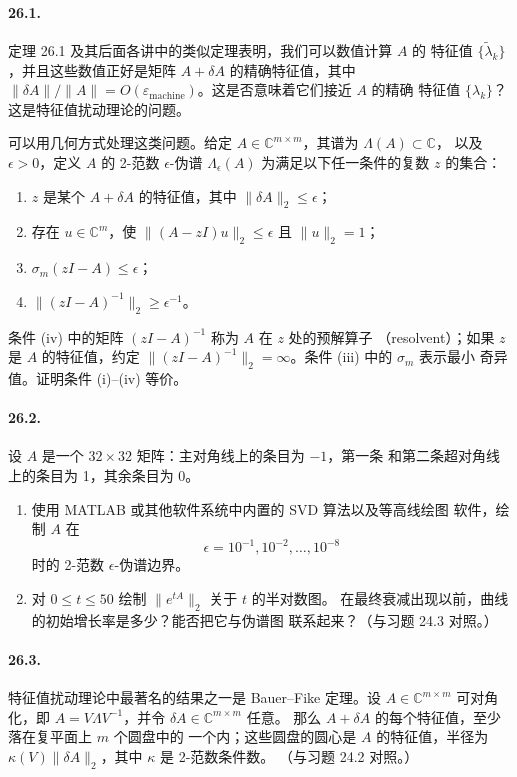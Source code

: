 \documentclass[UTF8,fontset=none,12pt]{ctexart}
\newcommand{\epsmach}{\varepsilon_{\mathrm{machine}}}
\begin{document}
\paragraph{26.1.}
定理 26.1 及其后面各讲中的类似定理表明，我们可以数值计算 $A$ 的
特征值 $\{\widetilde\lambda_k\}$，并且这些数值正好是矩阵
$A+\delta A$ 的精确特征值，其中
$\|\delta A\|/\|A\|=O(\epsmach)$。这是否意味着它们接近 $A$ 的精确
特征值 $\{\lambda_k\}$？这是特征值扰动理论的问题。

可以用几何方式处理这类问题。给定
$A\in\mathbb{C}^{m\times m}$，其谱为 $\Lambda(A)\subset\mathbb{C}$，
以及 $\epsilon>0$，定义 $A$ 的 2-范数 $\epsilon$-伪谱
$\Lambda_\epsilon(A)$ 为满足以下任一条件的复数 $z$ 的集合：
\begin{enumerate}[label=(\roman*)]
  \item $z$ 是某个 $A+\delta A$ 的特征值，其中
  $\|\delta A\|_2\le\epsilon$；
  \item 存在 $u\in\mathbb{C}^m$，使
  $\|(A-zI)u\|_2\le\epsilon$ 且 $\|u\|_2=1$；
  \item $\sigma_m(zI-A)\le\epsilon$；
  \item $\|(zI-A)^{-1}\|_2\ge\epsilon^{-1}$。
\end{enumerate}
条件 (iv) 中的矩阵 $(zI-A)^{-1}$ 称为 $A$ 在 $z$ 处的预解算子
（resolvent）；如果 $z$ 是 $A$ 的特征值，约定
$\|(zI-A)^{-1}\|_2=\infty$。条件 (iii) 中的 $\sigma_m$ 表示最小
奇异值。证明条件 (i)--(iv) 等价。

\paragraph{26.2.}
设 $A$ 是一个 $32\times32$ 矩阵：主对角线上的条目为 $-1$，第一条
和第二条超对角线上的条目为 1，其余条目为 0。

\begin{enumerate}[label=(\alph*)]
  \item 使用 MATLAB 或其他软件系统中内置的 SVD 算法以及等高线绘图
  软件，绘制 $A$ 在
  \[
  \epsilon=10^{-1},10^{-2},\ldots,10^{-8}
  \]
  时的 2-范数 $\epsilon$-伪谱边界。
  \item 对 $0\le t\le50$ 绘制 $\|e^{tA}\|_2$ 关于 $t$ 的半对数图。
  在最终衰减出现以前，曲线的初始增长率是多少？能否把它与伪谱图
  联系起来？（与习题 24.3 对照。）
\end{enumerate}

\paragraph{26.3.}
特征值扰动理论中最著名的结果之一是 Bauer--Fike 定理。设
$A\in\mathbb{C}^{m\times m}$ 可对角化，即
$A=V\Lambda V^{-1}$，并令 $\delta A\in\mathbb{C}^{m\times m}$ 任意。
那么 $A+\delta A$ 的每个特征值，至少落在复平面上 $m$ 个圆盘中的
一个内；这些圆盘的圆心是 $A$ 的特征值，半径为
$\kappa(V)\|\delta A\|_2$，其中 $\kappa$ 是 2-范数条件数。
（与习题 24.2 对照。）
\end{document}
